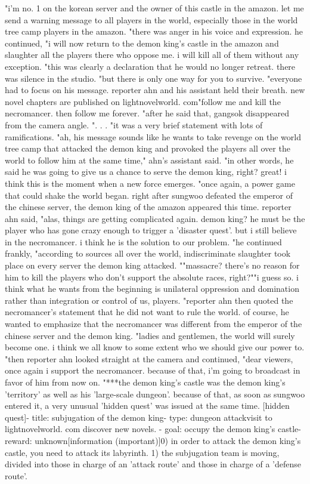 "i'm no.
 1 on the korean server and the owner of this castle in the amazon.
 let me send a warning message to all players in the world, especially those in the world tree camp players in the amazon.
"there was anger in his voice and expression.
he continued, "i will now return to the demon king's castle in the amazon and slaughter all the players there who oppose me.
 i will kill all of them without any exception.
"this was clearly a declaration that he would no longer retreat.
 there was silence in the studio.
"but there is only one way for you to survive.
"everyone had to focus on his message.
 reporter ahn and his assistant held their breath.
new novel chapters are published on lightnov­elworld.
com"follow me and kill the necromancer.
 then follow me forever.
"after he said that, gangsok disappeared from the camera angle.
".
.
.
"it was a very brief statement with lots of ramifications.
 "ah, his message sounds like he wants to take revenge on the world tree camp that attacked the demon king and provoked the players all over the world to follow him at the same time," ahn's assistant said.
 "in other words, he said he was going to give us a chance to serve the demon king, right? great! i think this is the moment when a new force emerges.
"once again, a power game that could shake the world began.
 right after sungwoo defeated the emperor of the chinese server, the demon king of the amazon appeared this time.
reporter ahn said, "alas, things are getting complicated again.
 demon king? he must be the player who has gone crazy enough to trigger a 'disaster quest'.
 but i still believe in the necromancer.
 i think he is the solution to our problem.
"he continued frankly, "according to sources all over the world, indiscriminate slaughter took place on every server the demon king attacked.
""massacre? there's no reason for him to kill the players who don't support the absolute races, right?""i guess so.
 i think what he wants from the beginning is unilateral oppression and domination rather than integration or control of us, players.
"reporter ahn then quoted the necromancer's statement that he did not want to rule the world.
 of course, he wanted to emphasize that the necromancer was different from the emperor of the chinese server and the demon king.
"ladies and gentlemen, the world will surely become one.
 i think we all know to some extent who we should give our power to.
"then reporter ahn looked straight at the camera and continued, "dear viewers, once again i support the necromancer.
 because of that, i'm going to broadcast in favor of him from now on.
"***the demon king's castle was the demon king's 'territory' as well as his 'large-scale dungeon'.
 because of that, as soon as sungwoo entered it, a very unusual 'hidden quest' was issued at the same time.
[hidden quest]- title: subjugation of the demon king- type: dungeon attackvisit to lightnovelworld.
com discover new novels.
- goal: occupy the demon king's castle- reward: unknown[information (important)]0) in order to attack the demon king's castle, you need to attack its labyrinth.
1) the subjugation team is moving, divided into those in charge of an 'attack route' and those in charge of a 'defense route'.


